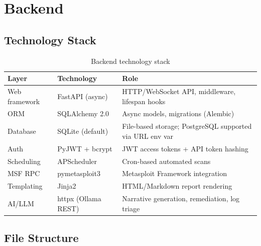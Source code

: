 \documentclass[11pt,a4paper,twoside,openright]{book}
\begin{document}
\chapter{Backend}

\section{Technology Stack}

\begin{table}[H]
\centering
\begin{tabularx}{\textwidth}{L{3cm} L{3.5cm} X}
\toprule
\textbf{Layer} & \textbf{Technology} & \textbf{Role} \\
\midrule
Web framework   & FastAPI (async)         & HTTP/WebSocket API, middleware, lifespan hooks \\
ORM             & SQLAlchemy 2.0          & Async models, migrations (Alembic) \\
Database        & SQLite (default)        & File-based storage; PostgreSQL supported via URL env var \\
Auth            & PyJWT + bcrypt          & JWT access tokens + API token hashing \\
Scheduling      & APScheduler             & Cron-based automated scans \\
MSF RPC         & pymetasploit3           & Metasploit Framework integration \\
Templating      & Jinja2                  & HTML/Markdown report rendering \\
AI/LLM          & httpx (Ollama REST)     & Narrative generation, remediation, log triage \\
\bottomrule
\end{tabularx}
\caption{Backend technology stack}
\end{table}

\section{File Structure}
\end{document}
